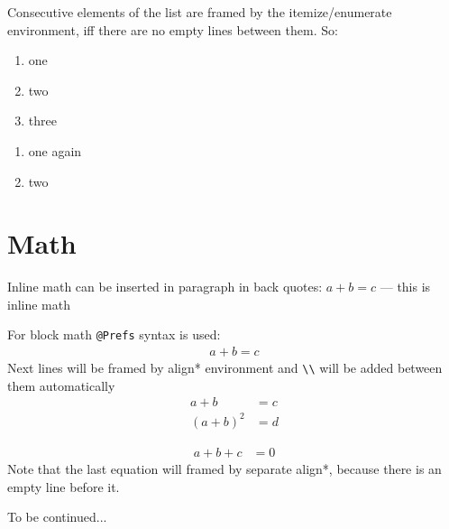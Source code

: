 \documentclass[12pt,a4paper,oneside]{article}
\begin{document}
Consecutive elements of the list are framed by the itemize/enumerate environment,
iff there are no empty lines between them. So:
\begin{enumerate}
\item one
\item two
\item three
\end{enumerate}

\begin{enumerate}
\item one again
\item two
\end{enumerate}

\section{Math}
Inline math can be inserted in paragraph in back quotes: $a + b = c$ 
--- this is inline math

For block math \texttt{@Prefs} syntax is used: 
\begin{align*}
a + b = c 
\end{align*}
Next lines will be framed by align* environment and \verb.\\. 
will be added between them automatically
\begin{align*}
a + b     &= c\\
(a + b)^2 &= d
\end{align*}

\begin{align*}
a + b + c &= 0
\end{align*}
Note that the last equation will framed by separate align*, because
there is an empty line before it. 

To be continued... 
\end{document}
